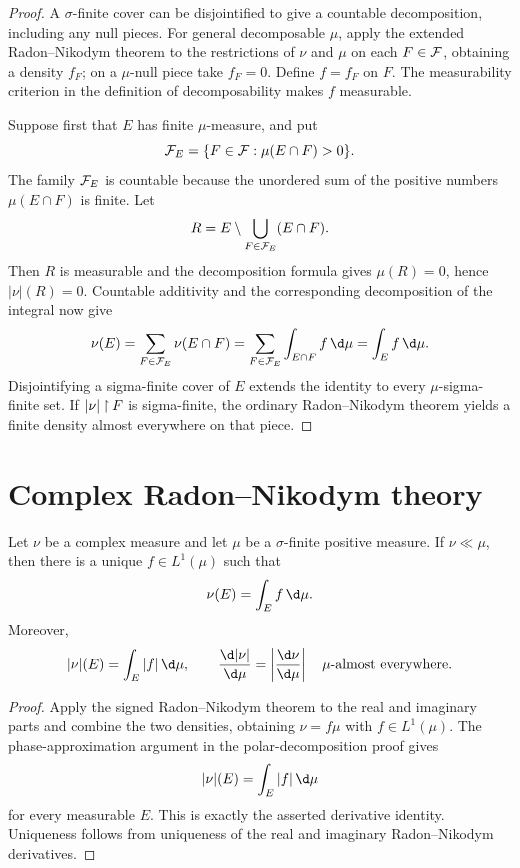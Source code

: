 \begin{proof}
A $\sigma$-finite cover can be disjointified to give a countable decomposition, including any null pieces. For general decomposable $\mu$, apply the extended Radon--Nikodym theorem to the restrictions of $\nu$ and $\mu$ on each $F\in\mathcal{F}$, obtaining a density $f_F$; on a $\mu$-null piece take $f_F=0$. Define $f=f_F$ on $F$. The measurability criterion in the definition of decomposability makes $f$ measurable.

Suppose first that $E$ has finite $\mu$-measure, and put
\[
\mathcal{F}_E=\{F\in\mathcal{F}:\mu(E\cap F)>0\}.
\]
The family $\mathcal{F}_E$ is countable because the unordered sum of the positive numbers $\mu(E\cap F)$ is finite. Let
\[
R=E\setminus\bigcup_{F\in\mathcal{F}_E}(E\cap F).
\]
Then $R$ is measurable and the decomposition formula gives $\mu(R)=0$, hence $|\nu|(R)=0$. Countable additivity and the corresponding decomposition of the integral now give
\[
\nu(E)=\sum_{F\in\cF_E}\nu(E\cap F)
       =\sum_{F\in\cF_E}\int_{E\cap F}f\,\d\mu
       =\int_Ef\,\d\mu.
\]
Disjointifying a sigma-finite cover of $E$ extends the identity to every $\mu$-sigma-finite set. If $|\nu|\mathbin{\upharpoonright} F$ is sigma-finite, the ordinary Radon--Nikodym theorem yields a finite density almost everywhere on that piece.
\end{proof}

\section{Complex Radon--Nikodym theory}

\begin{thm}
Let $\nu$ be a complex measure and let $\mu$ be a $\sigma$-finite positive measure. If $\nu\ll\mu$, then there is a unique $f\in L^1(\mu)$ such that
\[
\nu(E)=\int_Ef\,\d\mu.
\]
Moreover,
\[
|\nu|(E)=\int_E|f|\,\d\mu,
\qquad
\frac{\d|\nu|}{\d\mu}=\left|\frac{\d\nu}{\d\mu}\right|
\quad\mu\text{-almost everywhere}.
\]
\end{thm}

\begin{proof}
Apply the signed Radon--Nikodym theorem to the real and imaginary parts and combine the two densities, obtaining $\nu=f\mu$ with $f\in L^1(\mu)$. The phase-approximation argument in the polar-decomposition proof gives
\[
|\nu|(E)=\int_E|f|\,\d\mu
\]
for every measurable $E$. This is exactly the asserted derivative identity. Uniqueness follows from uniqueness of the real and imaginary Radon--Nikodym derivatives.
\end{proof}

